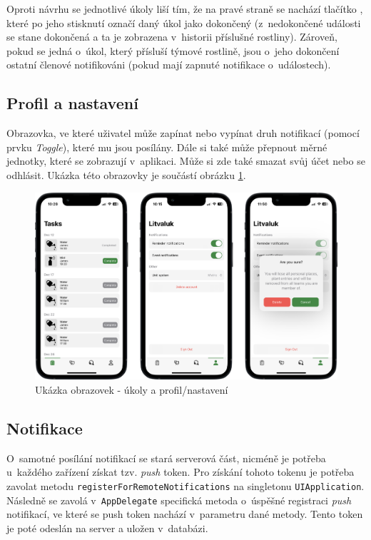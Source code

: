 \documentclass[thesis=M,czech]{FITthesis}[2019/12/23]
\begin{document}
Oproti návrhu se jednotlivé úkoly liší tím, že na pravé straně se nachází tlačítko , které po jeho stisknutí označí daný úkol jako dokončený (z~nedokončené události se stane dokončená a ta je zobrazena v~historii příslušné rostliny). Zároveň, pokud se jedná o~úkol, který přísluší týmové rostlině, jsou o~jeho dokončení ostatní členové notifikováni (pokud mají zapnuté notifikace o~událostech).

\subsection{Profil a nastavení}
Obrazovka, ve které uživatel může zapínat nebo vypínat druh notifikací (pomocí prvku \textit{Toggle}), které mu jsou posílány. Dále si také může přepnout měrné jednotky, které se zobrazují v~aplikaci. Může si zde také smazat svůj účet nebo se odhlásit. Ukázka této obrazovky je součástí obrázku \ref{img:screenshots-5}.

\begin{figure}
	\centering
	\includegraphics[width=1\linewidth]{images/screenshots-5.png}
  	\caption{Ukázka obrazovek - úkoly a profil/nastavení}
  	\label{img:screenshots-5}
\end{figure}

\subsection{Notifikace}
O~samotné posílání notifikací se stará serverová část, nicméně je potřeba u~každého zařízení získat tzv. \textit{push} token. Pro získání tohoto tokenu je potřeba zavolat metodu \texttt{registerForRemoteNotifications} na singletonu \texttt{UIApplication}. Následně se zavolá v~\texttt{AppDelegate} specifická metoda o~úspěšné registraci \textit{push} notifikací, ve které se push token nachází v~parametru dané metody. Tento token je poté odeslán na server a uložen v~databázi.
\end{document}
